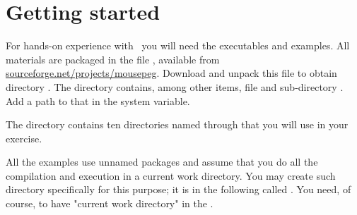 
\section{Getting started\label{GetStarted}}


For hands-on experience with \Mouse\ you will need the executables
and examples.
All materials 
are packaged in the  file ,
available from
\url{sourceforge.net/projects/mousepeg}.
Download and unpack this file to obtain directory
.
The directory contains, among other items,
 file  and sub-directory
. 
Add a path to that  in the  system variable.

The  directory contains
ten directories named  through 
that you will use in your exercise.

All the examples use unnamed packages and assume that you
do all the compilation and execution in a current work directory.
You may create such directory specifically for this purpose;
it is in the following called .
You need, of course, to have "current work directory" 
in the .
